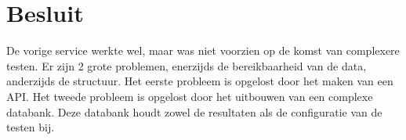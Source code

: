 \clearpage
\section{Besluit}
De vorige service werkte wel, maar was niet voorzien op de komst van complexere testen. Er zijn 2 grote problemen, enerzijds de bereikbaarheid van de data, anderzijds de structuur. Het eerste probleem is opgelost door het maken van een API. Het tweede probleem is opgelost door het uitbouwen van een complexe databank. Deze databank houdt zowel de resultaten als de configuratie van de testen bij.